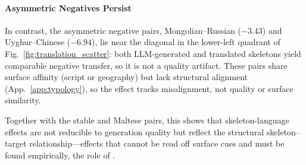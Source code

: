 \paragraph{Asymmetric Negatives Persist}
In contrast, the asymmetric negative pairs, Mongolian--Russian ($-3.43$) and Uyghur--Chinese ($-6.94$), lie near the diagonal in the lower-left quadrant of Fig.~\ref{fig:translation_scatter}: both LLM-generated and translated skeletons yield comparable negative transfer, so it is not a quality artifact. These pairs share surface affinity (script or geography) but lack structural alignment (App.~\ref{app:typology}), so the effect tracks misalignment, not quality or surface similarity.

Together with the stable and Maltese pairs, this shows that skeleton-language effects are not reducible to generation quality but reflect the structural skeleton--target relationship---effects that cannot be read off surface cues and must be found empirically, the role of \LASEF.
